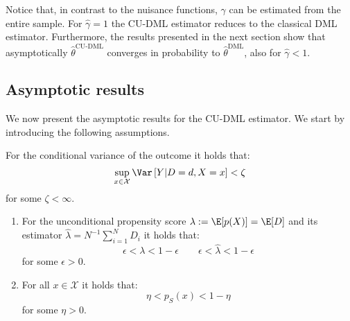 Notice that, in contrast to the nuisance functions, $\gamma$ can be estimated from the entire sample. For $\widehat{\gamma} = 1$ the CU-DML estimator reduces to the classical DML estimator. Furthermore, the results presented in the next section show that asymptotically $\widehat{\theta}^{\text{CU-DML}}$ converges in probability to $\widehat{\theta}^{\text{DML}}$, also for $\widehat{\gamma} < 1$.

\subsection{Asymptotic results}\label{subsec:asymptotic_results}
We now present the asymptotic results for the CU-DML estimator. We start by introducing the following assumptions.

\begin{assumption}\label{assumption:variance} For the conditional variance of the outcome it holds that:
    \begin{equation*}
        \sup_{x\in\mathcal{X}} \Var\left[Y|D=d,X=x\right] < \zeta
    \end{equation*}
    for some $\zeta < \infty$.
\end{assumption}


\begin{assumption}\label{assumption:propensity_score}\phantom{empty}
    \begin{enumerate}[label=(\roman*)]
        \item\label{assumption:propensity_score_1} For the unconditional propensity score $\lambda:=\E[p(X)]=\E[D]$ and its estimator $\widehat{\lambda} = N^{-1} \sum_{i=1}^N D_i$ it holds that:
        \begin{equation*}
            \epsilon < \lambda < 1 - \epsilon \qquad \epsilon < \widehat{\lambda} < 1 - \epsilon
        \end{equation*}
        for some $\epsilon > 0$.
        \item\label{assumption:propensity_score_2} For all $x\in\mathcal{X}$ it holds that:
        \begin{equation*}
            \eta < p_S(x) < 1 - \eta
        \end{equation*}
        for some $\eta > 0$.
    \end{enumerate}
\end{assumption}


